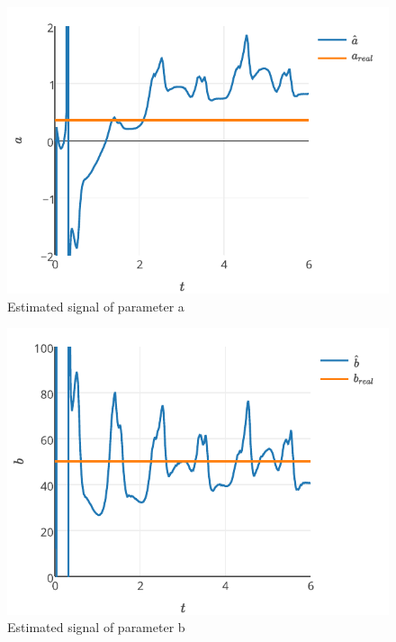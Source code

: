 \documentclass[journal]{IEEEtran}
\begin{document}
\begin{figure}[!t]
    \centering
    \includegraphics[width=\textwidth]{parametroa}
    \caption{Estimated signal of parameter a}
    \label{fig_parametroa}
\end{figure}

\begin{figure}[!t]
    \centering
    \includegraphics[width=\textwidth]{parametrob}
    \caption{Estimated signal of parameter b}
    \label{fig_parametrob}
\end{figure}
\end{document}
